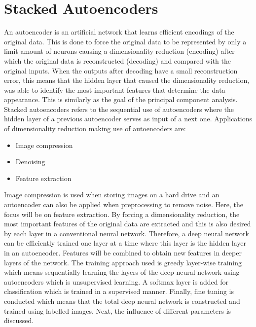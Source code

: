\documentclass[a4paper,10pt]{article}
\begin{document}
\section{Stacked Autoencoders}
An autoencoder is an artificial network that learns efficient encodings of the original data. This is done to force the original data to be represented by only a limit amount of neurons causing a dimensionality reduction (encoding) after which the original data is reconstructed (decoding) and compared with the original inputs. When the outputs after decoding have a small reconstruction error, this means that the hidden layer that caused the dimensionality reduction, was able to identify the most important features that determine the data appearance. This is similarly as the goal of the principal component analysis. Stacked autoencoders refers to the sequential use of autoencoders where the hidden layer of a previous autoencoder serves as input of a next one. Applications of dimensionality reduction making use of autoencoders are:
\begin{itemize}
	\item Image compression
	\item Denoising
	\item Feature extraction
\end{itemize}

Image compression is used when storing images on a hard drive and an autoencoder can also be applied when preprocessing to remove noise. Here, the focus will be on feature extraction. By forcing a dimensionality reduction, the most important features of the original data are extracted and this is also desired by each layer in a conventional neural network. Therefore, a deep neural network can be efficiently trained one layer at a time where this layer is the hidden layer in an autoencoder. Features will be combined to obtain new features in deeper layers of the network. The training approach used is greedy layer-wise training which means sequentially learning the layers of the deep neural network using autoencoders which is unsupervised learning. A softmax layer is added for classification which is trained in a supervised manner. Finally, fine tuning is conducted which means that the total deep neural network is constructed and trained using labelled images. Next, the influence of different parameters is discussed. 
\end{document}
